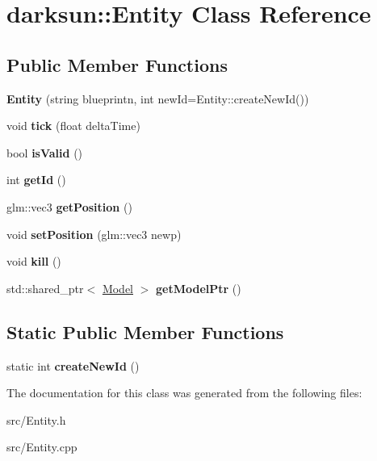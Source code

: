 \hypertarget{classdarksun_1_1_entity}{}\section{darksun\+::Entity Class Reference}
\label{classdarksun_1_1_entity}
\subsection*{Public Member Functions}
\begin{DoxyCompactItemize}
\item 
\mbox{\label{classdarksun_1_1_entity_adabbba0a50aeff0930fe0372597bc439}} 
{\bfseries Entity} (string blueprintn, int new\+Id=Entity\+::create\+New\+Id())
\item 
\mbox{\label{classdarksun_1_1_entity_ab56d2bd5cdf39fd661883eafda5d8d9f}} 
void {\bfseries tick} (float delta\+Time)
\item 
\mbox{\label{classdarksun_1_1_entity_a51f10028d7dbc2b6530595d94e6c4810}} 
bool {\bfseries is\+Valid} ()
\item 
\mbox{\label{classdarksun_1_1_entity_aaaeae6a61df4a20d32f20fa37d1874db}} 
int {\bfseries get\+Id} ()
\item 
\mbox{\label{classdarksun_1_1_entity_a020dd783a5bf24ad40226cf81f8e5d07}} 
glm\+::vec3 {\bfseries get\+Position} ()
\item 
\mbox{\label{classdarksun_1_1_entity_a29d88ffa485dc385a6305ffdef99b52b}} 
void {\bfseries set\+Position} (glm\+::vec3 newp)
\item 
\mbox{\label{classdarksun_1_1_entity_a309187079110e21926dc04fa1dde5b1f}} 
void {\bfseries kill} ()
\item 
\mbox{\label{classdarksun_1_1_entity_a0a279463cf4a8de2e1fc2f0445d1d0d2}} 
std\+::shared\+\_\+ptr$<$ \mbox{\hyperlink{classdarksun_1_1_model}{Model}} $>$ {\bfseries get\+Model\+Ptr} ()
\end{DoxyCompactItemize}
\subsection*{Static Public Member Functions}
\begin{DoxyCompactItemize}
\item 
\mbox{\label{classdarksun_1_1_entity_a05a11a7584d7eb181a921ced52cdeb70}} 
static int {\bfseries create\+New\+Id} ()
\end{DoxyCompactItemize}


The documentation for this class was generated from the following files\+:\begin{DoxyCompactItemize}
\item 
src/Entity.\+h\item 
src/Entity.\+cpp\end{DoxyCompactItemize}
